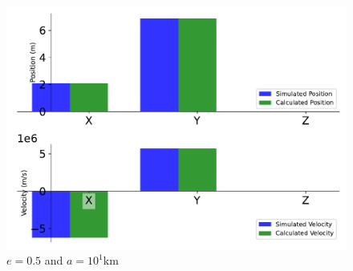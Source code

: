 \begin{figure}[htbp]\centerline{\includegraphics[height=0.7\textwidth, keepaspectratio]{AutoTeX/EquEllip_a_2}}\caption{$e = 0.5$ and $a = 10^1$km}\label{fig:EquEllip_a_2}\end{figure}